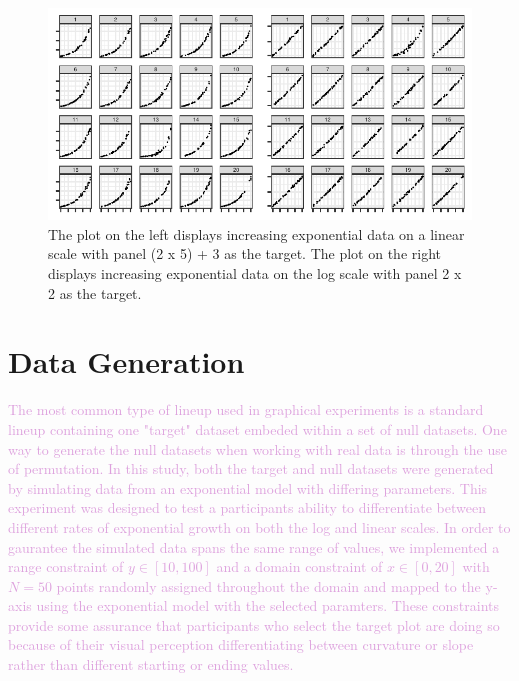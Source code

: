\documentclass[]{interact}
\theoremstyle{plain}%
\theoremstyle{definition}
\theoremstyle{remark}
\begin{document}
\begin{figure}

{\centering \includegraphics{jsm-2021-student-paper-submission_files/figure-latex/lineup-example-1} 

}

\caption{The plot on the left displays increasing exponential data on a linear scale with panel (2 x 5) + 3 as the target. The plot on the right displays increasing exponential data on the log scale with panel 2 x 2 as the target.}\label{fig:lineup-example}
\end{figure}

\hypertarget{data-generation}{%
\section{Data Generation}\label{data-generation}}

\textcolor{Plum}{
The most common type of lineup used in graphical experiments is a standard lineup containing one "target" dataset embeded within a set of null datasets. 
One way to generate the null datasets when working with real data is through the use of permutation. 
In this study, both the target and null datasets were generated by simulating data from an exponential model with differing parameters. 
This experiment was designed to test a participants ability to differentiate between different rates of exponential growth on both the log and linear scales. 
In order to gaurantee the simulated data spans the same range of values, we implemented a range constraint of $y\in [10,100]$ and a domain constraint of $x\in [0,20]$ with $N = 50$ points randomly assigned throughout the domain and mapped to the y-axis using the exponential model with the selected paramters. 
These constraints provide some assurance that participants who select the target plot are doing so because of their visual perception differentiating between curvature or slope rather than different starting or ending values. 
}
\end{document}
